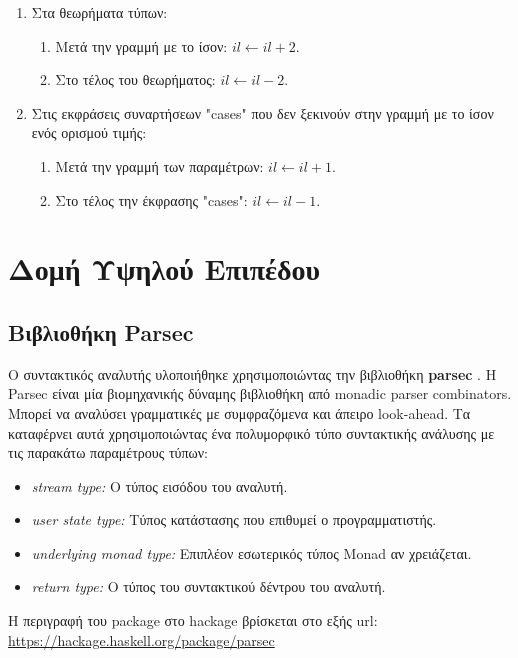 \documentclass[diploma]{softlab-thesis}
\begin{document}
\begin{enumerate}
\item
Στα θεωρήματα τύπων:
  \begin{enumerate}

  \item
  Μετά την γραμμή με το ίσον: $il \leftarrow il + 2$.

  \item
  Στο τέλος του θεωρήματος: $il \leftarrow il - 2$.
  \end{enumerate}

\item
Στις εκφράσεις συναρτήσεων "cases" που δεν ξεκινούν στην γραμμή με το ίσον
ενός ορισμού τιμής:
  \begin{enumerate}

  \item
  Μετά την γραμμή των παραμέτρων: $il \leftarrow il + 1$.

  \item
  Στο τέλος την έκφρασης "cases": $il \leftarrow il - 1$.

  \end{enumerate}

\end{enumerate}

\section{Δομή Υψηλού Επιπέδου}

\subsection{Βιβλιοθήκη Parsec}

Ο συντακτικός αναλυτής υλοποιήθηκε χρησιμοποιώντας την βιβλιοθήκη
\textbf{parsec} \cite{parsec}. Η Parsec είναι μία βιομηχανικής δύναμης
βιβλιοθήκη από monadic parser combinators. Μπορεί να αναλύσει
γραμματικές με συμφραζόμενα και άπειρο look-ahead. Τα καταφέρνει αυτά
χρησιμοποιώντας ένα πολυμορφικό τύπο συντακτικής ανάλυσης με τις παρακάτω
παραμέτρους τύπων:

\begin{itemize}
\item
  \textit{stream type:} Ο τύπος εισόδου του αναλυτή.
\item
  \textit{user state type:} Τύπος κατάστασης που επιθυμεί ο προγραμματιστής.
\item
  \textit{underlying monad type:}
  Επιπλέον εσωτερικός τύπος Monad αν χρειάζεται.
\item
  \textit{return type:} O τύπος του συντακτικού δέντρου του αναλυτή.
\end{itemize}
Η περιγραφή του package στο hackage βρίσκεται στο εξής url:\\
\url{https://hackage.haskell.org/package/parsec}
\end{document}

